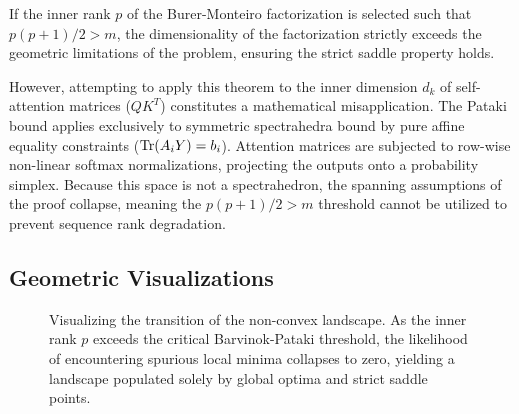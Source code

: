 If the inner rank $p$ of the Burer-Monteiro factorization is selected such that $p(p+1)/2 > m$, the dimensionality of the factorization strictly exceeds the geometric limitations of the problem, ensuring the strict saddle property holds.

However, attempting to apply this theorem to the inner dimension $d_k$ of self-attention matrices ($QK^T$) constitutes a mathematical misapplication. The Pataki bound applies exclusively to symmetric spectrahedra bound by pure affine equality constraints ($\mathrm{Tr}(A_i Y) = b_i$). Attention matrices are subjected to row-wise non-linear softmax normalizations, projecting the outputs onto a probability simplex. Because this space is not a spectrahedron, the spanning assumptions of the proof collapse, meaning the $p(p+1)/2 > m$ threshold cannot be utilized to prevent sequence rank degradation.

\subsection{Geometric Visualizations}

\begin{figure}[h!]
    \centering
    \caption{Visualizing the transition of the non-convex landscape. As the inner rank $p$ exceeds the critical Barvinok-Pataki threshold, the likelihood of encountering spurious local minima collapses to zero, yielding a landscape populated solely by global optima and strict saddle points.}
    \label{fig:pataki_threshold}
\end{figure}

